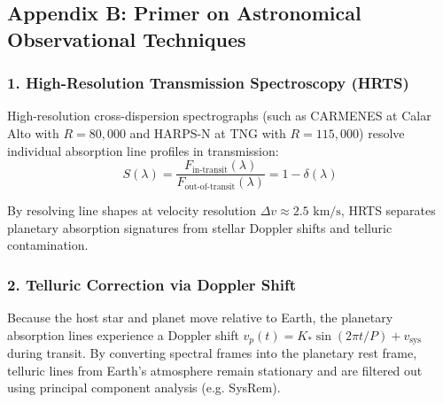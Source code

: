 \documentclass[11pt,a4paper]{article}
\begin{document}
\subsection*{Appendix B: Primer on Astronomical Observational Techniques}

\subsubsection*{1. High-Resolution Transmission Spectroscopy (HRTS)}
High-resolution cross-dispersion spectrographs (such as CARMENES at Calar Alto with $R = 80,000$ and HARPS-N at TNG with $R = 115,000$) resolve individual absorption line profiles in transmission:
\begin{equation}
S(\lambda) = \frac{F_{\text{in-transit}}(\lambda)}{F_{\text{out-of-transit}}(\lambda)} = 1 - \delta(\lambda)
\end{equation}

By resolving line shapes at velocity resolution $\Delta v \approx 2.5\text{ km/s}$, HRTS separates planetary absorption signatures from stellar Doppler shifts and telluric contamination.

\subsubsection*{2. Telluric Correction via Doppler Shift}
Because the host star and planet move relative to Earth, the planetary absorption lines experience a Doppler shift $v_p(t) = K_* \sin(2\pi t / P) + v_{\text{sys}}$ during transit. By converting spectral frames into the planetary rest frame, telluric lines from Earth's atmosphere remain stationary and are filtered out using principal component analysis (e.g. SysRem).
\end{document}
